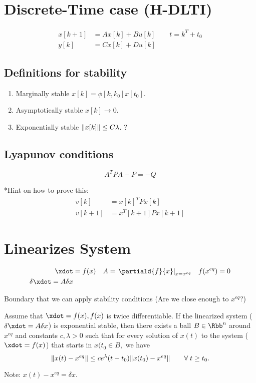 \documentclass{article}
\begin{document}
\section{Discrete-Time case (H-DLTI)}
\begin{equation}
  \begin{split}
    x[k+1] &= Ax[k] + Bu[k] \qquad t = k^T + t_0\\
    y[k] &= Cx[k] + Du[k]
  \end{split}
\end{equation}
\subsection{Definitions for stability}
\begin{enumerate}
\item Marginally stable $x[k] = \phi[k,k_0]x[t_0]$.
 \item Asymptotically stable $x[k] \rightarrow 0$.
\item Exponentially stable $\lVert x[k]\rVert \le C\lambda$.   ?
\end{enumerate}

\subsection{Lyapunov conditions}

\begin{equation}
  A^TPA - P = -Q
\end{equation}

*Hint on how to prove this:
\begin{equation}
  \begin{split}
    v[k] &= x[k]^TPx[k]\\
    v[k+1] &= x^T[k+1]Px[k+1]
  \end{split}
\end{equation}

\section{Linearizes System}

\begin{align}
  \xdot &= f(x) & A&= \left.\partiald{f}{x}\right|_{x = x^{eq}} &
  f(x^{eq}) &=0 \\
  \delta\xdot = A\delta x
\end{align}

Boundary that we can apply stability conditions (Are we close enough
to $x^{eq}$?)

Assume that $\xdot = f(x), f(x)$ is twice differentiable.
If the linearized system ($\delta\xdot = A\delta x$) is exponential
stable, then there exists a ball $B \in \Rbb^n$ around $x^{eq}$ and
constants $c,\lambda > 0$ such that for every solution of $x(t)$ to
the system ($\xdot = f(x)$) that starts in $x(t_0 \in B,$ we have
\begin{equation}
  \lVert x(t) - x^{eq}\rVert \le ce^\lambda(t-t_0) \lVert x(t_0) - x^{eq}\rVert
  \qquad \forall \; t \ge t_0.
\end{equation}

Note: $x(t) - x^{eq} = \delta x$.
\end{document}
